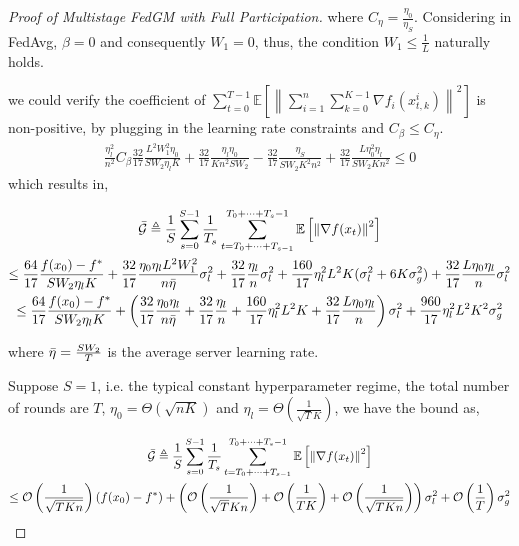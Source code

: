 \begin{proof}[Proof of Multistage FedGM with Full Participation]
where $C_\eta=\frac{\eta_0}{\eta_S}$. Considering in FedAvg, $\beta=0$ and consequently $W_1=0$, thus, the condition $W_1\leq \frac{1}{L}$ naturally holds.

we could verify the coefficient of $\sum_{t=0}^{T-1}\mathbb{E}\left[\left\| \sum_{i=1}^n\sum_{k=0}^{K-1}  \nabla f_i(x_{t,k}^i) \right\|^2\right]$ is non-positive, by plugging in the learning rate constraints and $C_\beta\leq C_\eta$.
\begin{equation}
\begin{gathered}
\frac{\eta^2_l}{n^2} C_\beta \frac{32}{17} \frac{L^2 W_1^2 \eta_0}{S W_2\eta_l K} +  \frac{32}{17} \frac{\eta_l\eta_0}{Kn^2 S W_2} - \frac{32}{17}\frac{\eta_S}{S W_2K^2n^2} + \frac{32}{17} \frac{L\eta_0^2  \eta_l }{S W_2 K n^2} \le 0
\end{gathered}\nonumber
\end{equation}
which results in,

\begin{equation}
\begin{gathered}
\Bar{\mathcal{G}}\triangleq\frac{1}{S}\sum_{s=0}^{S-1} \frac{1}{T_s}\sum_{t=T_0+\dots+T_{s-1} }^{T_0+\dots+T_s-1} \mathbb{E}\left[\left\|\nabla f(x_t)\right\|^2\right]\\
\leq \frac{64}{17}\frac{f(x_0)-f^\ast}{S W_2 \eta_l K} +  \frac{32}{17} \frac{\eta_0\eta_lL^2W_1^2}{n\Bar{\eta}}\sigma_l^2
+\frac{32}{17}\frac{\eta_l}{n}\sigma_l^2  +\frac{160}{17} \eta_l^2L^2K (\sigma_l^2+6K\sigma_g^2)+\frac{32}{17} \frac{L \eta_0 \eta_l }{n}\sigma_l^2 \\
\leq \frac{64}{17}\frac{f(x_0)-f^\ast}{S W_2 \eta_l K} + \left(\frac{32}{17} \frac{\eta_0\eta_l }{n\Bar{\eta}}+\frac{32}{17}\frac{\eta_l}{n}+\frac{160}{17} \eta_l^2L^2K+\frac{32}{17} \frac{L \eta_0 \eta_l }{n}\right)  \sigma_l^2+
\frac{960}{17} \eta_l^2L^2K^2 \sigma_g^2
\end{gathered}\nonumber
\end{equation}

where $\Bar{\eta}=\frac{S W_2}{T}$ is the average server learning rate.


Suppose $S=1$, i.e. the typical constant hyperparameter regime, the total number of rounds are $T$, $\eta_0=\Theta\left(\sqrt{nK}\right)$ and $\eta_l=\Theta\left(\frac{1}{\sqrt{T}K}\right)$, we have the bound as,

\begin{equation}
\begin{gathered}
\Bar{\mathcal{G}}\triangleq\frac{1}{S}\sum_{s=0}^{S-1} \frac{1}{T_s}\sum_{t=T_0+\dots+T_{s-1} }^{T_0+\dots+T_s-1} \mathbb{E}\left[\left\|\nabla f(x_t)\right\|^2\right]\\
\leq  \mathcal{O}\left(\frac{1}{\sqrt{TKn}}\right) \left(f(x_0)-f^\ast\right) + \left(\mathcal{O}\left(\frac{1}{\sqrt{T}Kn}\right)+ \mathcal{O}\left(\frac{1}{TK}\right) + \mathcal{O}\left(\frac{1}{\sqrt{TKn}}\right) \right)  \sigma_l^2+
\mathcal{O}\left(\frac{1}{T}\right) \sigma_g^2
\end{gathered}\nonumber
\end{equation}


\end{proof}
